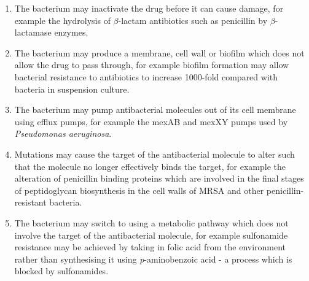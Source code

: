 \begin{enumerate}
\item The bacterium may inactivate the drug before it can cause damage, for example the hydrolysis of $\beta$-lactam antibiotics such as penicillin by $\beta$-lactamase enzymes.

\item The bacterium may produce a membrane, cell wall or biofilm which does not allow the drug to pass through, for example biofilm formation may allow bacterial resistance to antibiotics to increase 1000-fold compared with bacteria in suspension culture\cite{Stewart2001}.

\item The bacterium may pump antibacterial molecules out of its cell membrane using efflux pumps, for example the mexAB and mexXY pumps used by \textit{Pseudomonas aeruginosa}\cite{Poole2004}.

\item Mutations may cause the target of the antibacterial molecule to alter such that the molecule no longer effectively binds the target, for example the alteration of penicillin binding proteins which are involved in the final stages of peptidoglycan biosynthesis in the cell walls of MRSA and other penicillin-resistant bacteria\cite{Fuda2004}.

\item The bacterium may switch to using a metabolic pathway which does not involve the target of the antibacterial molecule, for example sulfonamide resistance may be achieved by taking in folic acid from the environment rather than synthesising it using \textit{p}-aminobenzoic acid - a process which is blocked by sulfonamides\cite{Skold2000}.

\end{enumerate}

